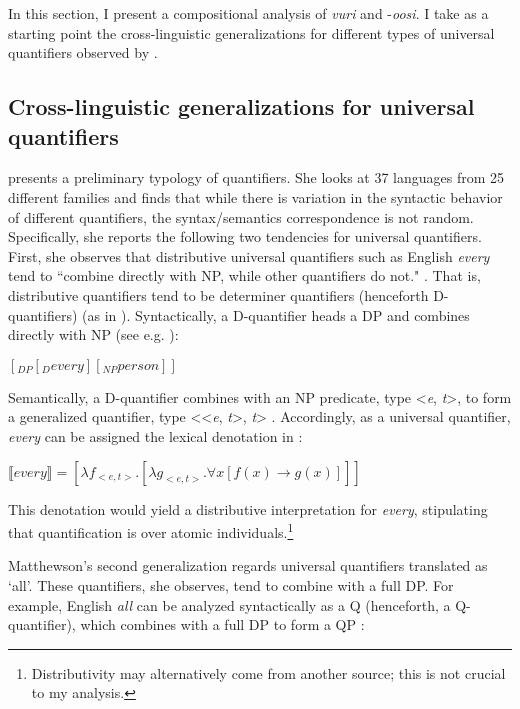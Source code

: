 \documentclass[output=paper]{langsci/langscibook}
\begin{document}
In this section, I present a compositional analysis of \textit{vuri} and -\textit{oosi}. I take as a starting point the cross-linguistic generalizations for different types of universal quantifiers observed by \citet{Matthewson2013}. 

\subsection{Cross-linguistic generalizations for universal quantifiers}

\citet{Matthewson2013} presents a preliminary typology of quantifiers. She looks at 37 languages from 25 different families and finds that while there is variation in the syntactic behavior of different quantifiers, the syntax/semantics correspondence is not random. Specifically, she reports the following two tendencies for universal quantifiers. First, she observes that distributive universal quantifiers such as English \textit{every} tend to ``combine directly with NP, while other quantifiers do not." \citep[36]{Matthewson2013}. That is, distributive quantifiers tend to be determiner quantifiers (henceforth D-quantifiers) (as in \citealt{BarwiseCooper1981}). Syntactically, a D-quantifier heads a DP and combines directly with NP (see e.g. \citealt[146]{HeimKratzer1998}): 

\ea\label{ex:landman:}
$[_{DP} [_{D} every] [_{NP} person]]$
\z

Semantically, a D-quantifier combines with an NP predicate, type <\textit{e}, \textit{t}>, to form a generalized quantifier, type <<\textit{e}, \textit{t}>, \textit{t}> \citep{Montague1973,BarwiseCooper1981}. Accordingly, as a universal quantifier, \textit{every} can be assigned the lexical denotation in :
 
\ea\label{ex:landman:15}
$⟦every⟧ = [{\lambda}f_{<e,t>} . [{\lambda}g_{<e,t>}. {\forall}x [f(x) \to g(x)]]]$
\z

This denotation would yield a distributive interpretation for \textit{every}, stipulating that quantification is over atomic individuals.\footnote{ Distributivity may alternatively come from another source; this is not crucial to my analysis.}

Matthewson's second generalization regards universal quantifiers translated as ‘all’. These quantifiers, she observes, tend to combine with a full DP. For example, English \textit{all} can be analyzed syntactically as a Q (henceforth, a Q-quantifier), which combines with a full DP to form a QP \citep{Matthewson2001}:  
\end{document}
